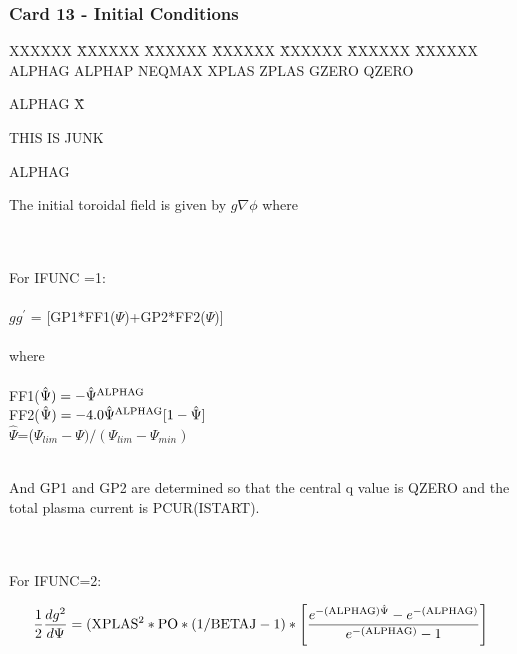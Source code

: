 \newpage \subsubsection{Card 13 - Initial Conditions}
\begin{tabbing}
XXXXXX \= XXXXXX \= XXXXXX \= XXXXXX \= XXXXXX \= XXXXXX \=
XXXXXX        \\
\footnotesize ALPHAG \>\footnotesize ALPHAP \>\footnotesize NEQMAX \>\footnotesize
XPLAS \>\footnotesize ZPLAS \>\footnotesize GZERO \>\footnotesize QZERO
\end{tabbing}
\begin{tabbing}
ALPHAG \= X\= \parbox[t]{\width}{THIS IS JUNK} \kill
ALPHAG \> \> \parbox[t]{\width}{The initial toroidal field is given by $g\nabla \phi$ where} \\
 \\
\> \>For IFUNC =1: \\
 \\
 \> \> $gg^{'}$ = [GP1*FF1($\Psi$)+GP2*FF2($\Psi$)]\\
  \\
 \> \> where\\
  \\
 \> \> FF1($\hat{\Psi})=-\hat{\Psi}^{\rm ALPHAG}$\\
 \> \> FF2($\hat{\Psi})=-4.0\hat{\Psi}^{\rm ALPHAG} [1-\hat{\Psi}]$\\
 \> \> $\hat{\Psi}$=($\Psi_{lim}-\Psi)/(\Psi_{lim}-\Psi_{min})$\\
 \\
 \> \> \parbox[t]{\width}{And GP1 and GP2 are determined so that the central q value is QZERO
and the total plasma current is PCUR(ISTART).}\\
 \\
\> \> For IFUNC=2:
\end{tabbing}
\begin{displaymath}
\frac{1}{2} \frac{dg^2}{d\Psi} = ({\rm XPLAS^2*PO*(1/BETAJ-1)}*\left[
\frac{e^{-({\rm ALPHAG})\hat{\Psi}}-e^{-({\rm ALPHAG})}}{e^{-({\rm ALPHAG})}-1} \right
]
\end{displaymath}
